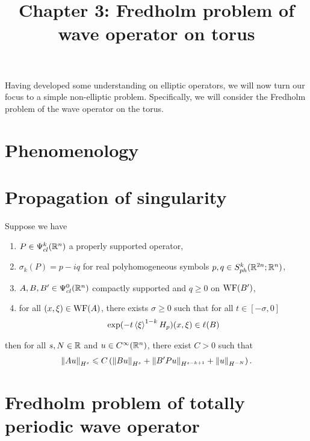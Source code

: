 \documentclass[12pt]{article}
\title{Chapter 3: Fredholm problem of wave operator on torus}
\date{}
\begin{document}
\maketitle

Having developed some understanding on elliptic operators, we will now turn our focus to a simple non-elliptic problem. Specifically, we will consider the Fredholm problem of the wave operator on the torus. 


\section{Phenomenology} 


\section{Propagation of singularity} 

\begin{ftheorem} 
    Suppose we have 
    \begin{enumerate}
        \item $P \in \Psi^k_{cl}(\R^n)$ a properly supported operator,
        \item $\sigma_{k}(P) = p - iq$ for real polyhomogeneous symbols $p, q \in S^{k}_{ph}(\R^{2n}; \R^{n})$, 
        \item $A, B, B' \in \Psi^{0}_{cl}(\R^n)$ compactly supported and $q \geq 0 $ on $\WF(B')$, 
        \item for all $(x, \xi) \in \WF(A)$, there exists $\sigma \geq 0$ such that for all $t \in [-\sigma, 0]$
        \begin{align*}
            \exp(-t\sym[\xi]^{1-k}H_p)(x, \xi) \in \ell(B)
        \end{align*}
    \end{enumerate}
    then for all $s, N \in \R$ and $u \in C^\infty(\R^n)$, there exist $C > 0$ such that 
    \begin{align*}
        \norm[Au]_{H^s} \leq C\brac{\norm[Bu]_{H^s} + \norm[B'Pu]_{H^{s - k + 1}} + \norm[u]_{H^{-N}}}. 
    \end{align*}
\end{ftheorem}


\section{Fredholm problem of totally periodic wave operator} 
\end{document}
